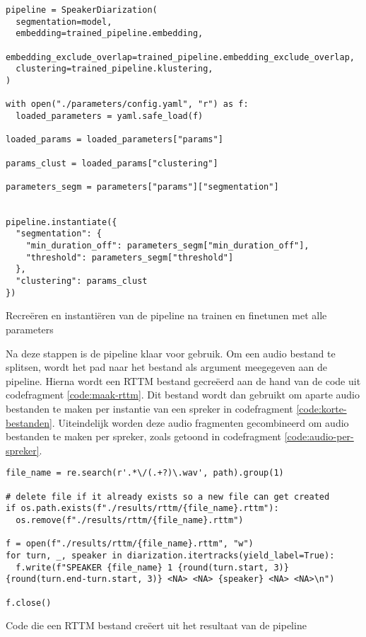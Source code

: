 \begin{listing}
	\begin{verbatim}
pipeline = SpeakerDiarization(
  segmentation=model,
  embedding=trained_pipeline.embedding,
  embedding_exclude_overlap=trained_pipeline.embedding_exclude_overlap,
  clustering=trained_pipeline.klustering,
)

with open("./parameters/config.yaml", "r") as f:
  loaded_parameters = yaml.safe_load(f)

loaded_params = loaded_parameters["params"]

params_clust = loaded_params["clustering"]

parameters_segm = parameters["params"]["segmentation"]


pipeline.instantiate({
  "segmentation": {
    "min_duration_off": parameters_segm["min_duration_off"],
    "threshold": parameters_segm["threshold"]
  },
  "clustering": params_clust
})
	\end{verbatim}
	\caption[Recreëren van de getrainde pipeline met alle parameters]{\label{code:tweede-stap}Recreëren en instantiëren van de pipeline na trainen en finetunen met alle parameters}
\end{listing}

Na deze stappen is de pipeline klaar voor gebruik. Om een audio bestand te splitsen, wordt het pad naar het bestand als argument meegegeven aan de pipeline. Hierna wordt een RTTM bestand gecreëerd aan de hand van de code uit codefragment \ref{code:maak-rttm}. Dit bestand wordt dan gebruikt om aparte audio bestanden te maken per instantie van een spreker in codefragment \ref{code:korte-bestanden}. Uiteindelijk worden deze audio fragmenten gecombineerd om audio bestanden te maken per spreker, zoals getoond in codefragment \ref{code:audio-per-spreker}.

\begin{listing}
	\begin{verbatim}
file_name = re.search(r'.*\/(.+?)\.wav', path).group(1)

# delete file if it already exists so a new file can get created
if os.path.exists(f"./results/rttm/{file_name}.rttm"):
  os.remove(f"./results/rttm/{file_name}.rttm")

f = open(f"./results/rttm/{file_name}.rttm", "w")
for turn, _, speaker in diarization.itertracks(yield_label=True):
  f.write(f"SPEAKER {file_name} 1 {round(turn.start, 3)} {round(turn.end-turn.start, 3)} <NA> <NA> {speaker} <NA> <NA>\n")

f.close()
	\end{verbatim}
	\caption[Code om RTTM bestand te creëren]{\label{code:maak-rttm}Code die een RTTM bestand creëert uit het resultaat van de pipeline}
\end{listing}

